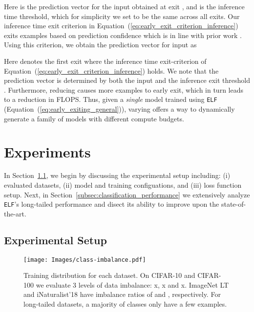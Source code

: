 \documentclass{article}
\newcommand{\method}{\texttt{ELF}\xspace}
\begin{document}
Here  is the prediction vector for the input  obtained at exit , and  is the inference time threshold, which for simplicity we set to be the same across all exits.
Our inference time exit criterion in Equation~(\ref{eq:early_exit_criterion_inference}) exits examples based on prediction confidence which is in line with prior work \cite{huang2017multi, Phuong_2019_ICCV}. 
Using this criterion, we obtain the prediction vector  for input   as


Here  denotes the first exit where the inference time exit-criterion of Equation~(\ref{eq:early_exit_criterion_inference}) holds. 
We note that the prediction vector  is determined by both the input  and the inference exit threshold . Furthermore, reducing  causes more examples to early exit, which in turn leads to a reduction in FLOPS. 
Thus, given a \textit{single} model trained using \method{} (Equation~(\ref{eq:early_exiting_general})), varying   offers a way to dynamically generate a family of models with different compute budgets.


 \section{Experiments}
In Section~\ref{subsec:experimental_setup}, we begin by discussing the experimental setup including: (i) evaluated datasets, (ii) model and training configuations, and (iii) loss function setup.
Next, in Section~\ref{subsec:classification_performance} we extensively analyze \method{}'s long-tailed performance and disect its ability to improve upon the state-of-the-art.

\subsection{Experimental Setup}\label{subsec:experimental_setup}


\begin{figure*}[t!]
    \texttt{[image: Images/class-imbalance.pdf]}
    \caption{
    Training distribution for each dataset. 
    On CIFAR-10 and CIFAR-100 we evaluate 3 levels of data imbalance: x, x and x. 
    ImageNet LT and iNaturalist'18 have imbalance ratios of  and , respectively. For long-tailed datasets, a majority of classes only have a few examples.  
    }
    \label{fig:imbalance}
\end{figure*}
\end{document}
